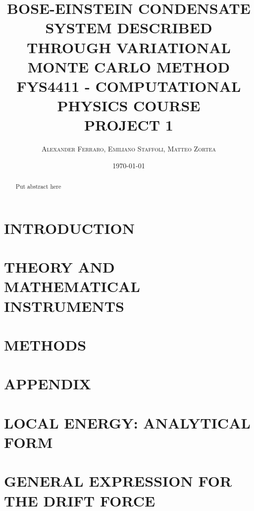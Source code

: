 \documentclass[a4paper]{article}
\title{\Large BOSE-EINSTEIN CONDENSATE SYSTEM DESCRIBED THROUGH VARIATIONAL MONTE CARLO METHOD \\ \vspace{5mm}  \large FYS4411 - COMPUTATIONAL PHYSICS COURSE \\ \large PROJECT 1 }
\author{\textsc{Alexander Ferraro, Emiliano Staffoli, Matteo Zortea}}
\date{\today}
\begin{document}
\setcounter{page}{1}

\maketitle

\begin{abstract}
    Put abstract here
\end{abstract}

\begin{multicols*}{2}
 \noindent

\section{INTRODUCTION}
   
   
\section{THEORY AND MATHEMATICAL INSTRUMENTS}
    
   
\section{METHODS}
    

\newpage
\section*{APPENDIX}
\appendix
\section{LOCAL ENERGY: ANALYTICAL FORM}
\label{appendix:local_energy}


\section{GENERAL EXPRESSION FOR THE DRIFT FORCE}
\label{appendix:drift_force_general}






\end{multicols*}

\newpage
\printbibliography
\end{document}
